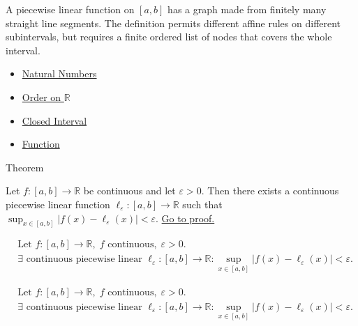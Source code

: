 \begin{remark*}[Interpretation]
A piecewise linear function on $[a,b]$ has a graph made from finitely
many straight line segments. The definition permits different affine
rules on different subintervals, but requires a finite ordered list of
nodes that covers the whole interval.
\end{remark*}

\begin{dependencies}
\begin{itemize}
  \item \hyperref[def:natural-numbers]{Natural Numbers}
  \item \hyperref[def:order-on-r]{Order on $\mathbb{R}$}
  \item \hyperref[def:closed-interval]{Closed Interval}
  \item \hyperref[def:function]{Function}
\end{itemize}
\end{dependencies}

\begin{theorembox}{Theorem}
\begin{theorem}
\label{thm:piecewise-linear-approximation}
Let $f\colon[a,b]\to\mathbb{R}$ be continuous and let $\varepsilon>0$. Then there exists a continuous piecewise linear function $\ell_\varepsilon\colon[a,b]\to\mathbb{R}$ such that $\sup_{x\in[a,b]}|f(x)-\ell_\varepsilon(x)|<\varepsilon$. \hyperref[prf:piecewise-linear-approximation]{Go to proof.}
\end{theorem}
\end{theorembox}

\begin{remark*}
\[
\begin{aligned}
&\text{Let } f\colon[a,b]\to\mathbb{R},\; f \text{ continuous},\; \varepsilon>0.\\
&\exists\text{ continuous piecewise linear }\ell_\varepsilon\colon[a,b]\to\mathbb{R}:
\sup_{x\in[a,b]}|f(x)-\ell_\varepsilon(x)|<\varepsilon.
\end{aligned}
\]
\end{remark*}

\begin{remark*}
\[
\begin{aligned}
&\text{Let } f\colon[a,b]\to\mathbb{R},\; f \text{ continuous},\; \varepsilon>0.\\
&\exists\text{ continuous piecewise linear }\ell_\varepsilon\colon[a,b]\to\mathbb{R}:
\sup_{x\in[a,b]}|f(x)-\ell_\varepsilon(x)|<\varepsilon.
\end{aligned}
\]
\end{remark*}

